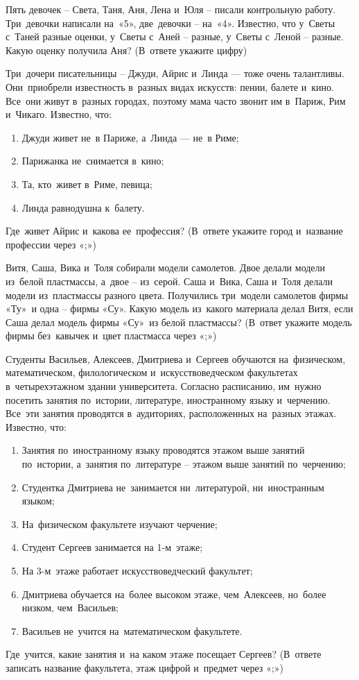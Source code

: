 Пять девочек – Света, Таня, Аня, Лена и~Юля – писали контрольную работу. 
Три~девочки написали на~«5», две~девочки – на~«4». Известно, что у~Светы с~Таней разные оценки, 
у~Светы с~Аней – разные, у~Светы с~Леной – разные. 
Какую оценку получила Аня? (В~ответе укажите цифру)

Три~дочери писательницы – Джуди, Айрис и~Линда — тоже очень талантливы. 
Они~приобрели известность в~разных видах искусств: пении, балете и~кино. 
Все~они живут в~разных городах, поэтому мама часто звонит им в~Париж, Рим и~Чикаго. 
Известно, что:
\renewcommand{\labelenumi}{\arabic{enumi})}
\begin{enumerate}
    \item Джуди живет не~в Париже, а~Линда — не~в Риме;
    \item Парижанка не~снимается в~кино;
    \item Та, кто~живет в~Риме, певица;
    \item Линда равнодушна к~балету.
\end{enumerate}
Где~живет Айрис и~какова ее~профессия? (В~ответе укажите город и~название профессии через «;»)

Витя, Саша, Вика и~Толя собирали модели самолетов. Двое делали модели из~белой пластмассы, а~двое – из~серой. 
Саша и~Вика, Саша и~Толя делали модели из~пластмассы разного цвета. 
Получились три~модели самолетов фирмы «Ту»~и одна – фирмы «Су». 
Какую модель из~какого материала делал Витя, если Саша делал модель фирмы «Су»~из белой пластмассы? 
(В~ответ укажите модель фирмы без~кавычек и~цвет пластмасса через «;»)

Студенты Васильев, Алексеев, Дмитриева и~Сергеев обучаются на~физическом, математическом, 
филологическом и~искусствоведческом факультетах в~четырехэтажном здании университета. 
Согласно расписанию, им~нужно посетить занятия по~истории, литературе, иностранному языку и~черчению. 
Все~эти занятия проводятся в~аудиториях, расположенных на~разных этажах.
Известно, что:
\renewcommand{\labelenumi}{\arabic{enumi})}
\begin{enumerate}
    \item Занятия по~иностранному языку проводятся этажом выше занятий по~истории, а~занятия по~литературе – этажом выше занятий по~черчению;
    \item Студентка Дмитриева не~занимается ни~литературой, ни~иностранным языком;
    \item На~физическом факультете изучают черчение;
    \item Студент Сергеев занимается на 1-м~этаже;
    \item На 3-м~этаже работает искусствоведческий факультет;
    \item Дмитриева обучается на~более высоком этаже, чем~Алексеев, но~более низком, чем~Васильев;
    \item Васильев не~учится на~математическом факультете.
\end{enumerate}
Где~учится, какие занятия и~на каком этаже посещает Сергеев? 
(В~ответе записать название факультета, этаж цифрой и~предмет через «;»)

